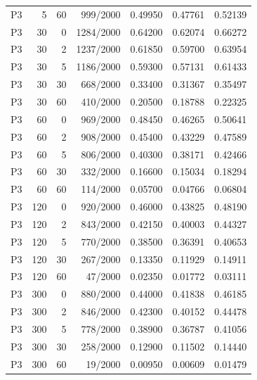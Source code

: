 \begin{tabular}{lrrrrrr}
P3 & 5 & 60 & 999/2000 & 0.49950 & 0.47761 & 0.52139 \\
P3 & 30 & 0 & 1284/2000 & 0.64200 & 0.62074 & 0.66272 \\
P3 & 30 & 2 & 1237/2000 & 0.61850 & 0.59700 & 0.63954 \\
P3 & 30 & 5 & 1186/2000 & 0.59300 & 0.57131 & 0.61433 \\
P3 & 30 & 30 & 668/2000 & 0.33400 & 0.31367 & 0.35497 \\
P3 & 30 & 60 & 410/2000 & 0.20500 & 0.18788 & 0.22325 \\
P3 & 60 & 0 & 969/2000 & 0.48450 & 0.46265 & 0.50641 \\
P3 & 60 & 2 & 908/2000 & 0.45400 & 0.43229 & 0.47589 \\
P3 & 60 & 5 & 806/2000 & 0.40300 & 0.38171 & 0.42466 \\
P3 & 60 & 30 & 332/2000 & 0.16600 & 0.15034 & 0.18294 \\
P3 & 60 & 60 & 114/2000 & 0.05700 & 0.04766 & 0.06804 \\
P3 & 120 & 0 & 920/2000 & 0.46000 & 0.43825 & 0.48190 \\
P3 & 120 & 2 & 843/2000 & 0.42150 & 0.40003 & 0.44327 \\
P3 & 120 & 5 & 770/2000 & 0.38500 & 0.36391 & 0.40653 \\
P3 & 120 & 30 & 267/2000 & 0.13350 & 0.11929 & 0.14911 \\
P3 & 120 & 60 & 47/2000 & 0.02350 & 0.01772 & 0.03111 \\
P3 & 300 & 0 & 880/2000 & 0.44000 & 0.41838 & 0.46185 \\
P3 & 300 & 2 & 846/2000 & 0.42300 & 0.40152 & 0.44478 \\
P3 & 300 & 5 & 778/2000 & 0.38900 & 0.36787 & 0.41056 \\
P3 & 300 & 30 & 258/2000 & 0.12900 & 0.11502 & 0.14440 \\
P3 & 300 & 60 & 19/2000 & 0.00950 & 0.00609 & 0.01479 \\
\bottomrule\end{tabular}
